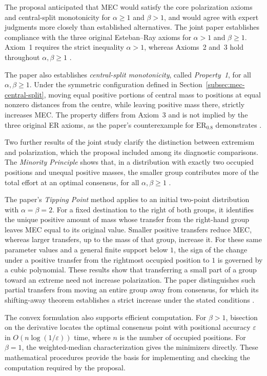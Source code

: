 \documentclass{article}
\theoremstyle{plain}
\theoremstyle{remark}
\begin{document}
The proposal anticipated that MEC would satisfy the core polarization axioms and central-split monotonicity for $\alpha\geq1$ and $\beta>1$, and would agree with expert judgments more closely than established alternatives. The joint paper establishes compliance with the three original Esteban--Ray axioms for $\alpha>1$ and $\beta\geq1$. Axiom~1 requires the strict inequality $\alpha>1$, whereas Axioms~2 and~3 hold throughout $\alpha,\beta\geq1$ \citep{aranda2026mec}.

The paper also establishes \emph{central-split monotonicity}, called \emph{Property~1}, for all $\alpha,\beta\geq1$. Under the symmetric configuration defined in Section~\ref{subsec:mec-central-split}, moving equal positive portions of central mass to positions at equal nonzero distances from the centre, while leaving positive mass there, strictly increases MEC. The property differs from Axiom~3 and is not implied by the three original ER axioms, as the paper's counterexample for $\mathrm{ER}_{0.8}$ demonstrates \citep{aranda2026mec}.

Two further results of the joint study clarify the distinction between extremism and polarization, which the proposal included among its diagnostic comparisons. The \emph{Minority Principle} shows that, in a distribution with exactly two occupied positions and unequal positive masses, the smaller group contributes more of the total effort at an optimal consensus, for all $\alpha,\beta\geq1$ \citep{aranda2026mec}.

The paper's \emph{Tipping Point} method applies to an initial two-point distribution with $\alpha=\beta=2$. For a fixed destination to the right of both groups, it identifies the unique positive amount of mass whose transfer from the right-hand group leaves MEC equal to its original value. Smaller positive transfers reduce MEC, whereas larger transfers, up to the mass of that group, increase it. For these same parameter values and a general finite support below $1$, the sign of the change under a positive transfer from the rightmost occupied position to $1$ is governed by a cubic polynomial. These results show that transferring a small part of a group toward an extreme need not increase polarization. The paper distinguishes such partial transfers from moving an entire group away from consensus, for which its shifting-away theorem establishes a strict increase under the stated conditions \citep{aranda2026mec}.

The convex formulation also supports efficient computation. For $\beta>1$, bisection on the derivative locates the optimal consensus point with positional accuracy $\varepsilon$ in $O(n\log(1/\varepsilon))$ time, where $n$ is the number of occupied positions. For $\beta=1$, the weighted-median characterization gives the minimizers directly. These mathematical procedures provide the basis for implementing and checking the computation required by the proposal.
\end{document}
